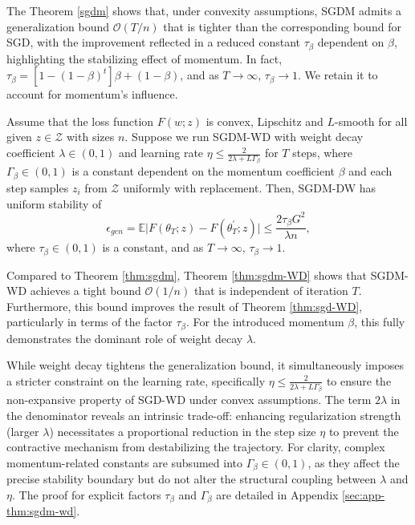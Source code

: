 \begin{remark}
The Theorem \ref{sgdm} shows that, under convexity assumptions, SGDM admits a generalization bound $\mathcal{O}(T/n)$ that is tighter than the corresponding bound for SGD, with the improvement reflected in a reduced constant $\tau_\beta$ dependent on $\beta$, highlighting the stabilizing effect of momentum.
In fact, $\tau_\beta=[1-(1-\beta)^t]\beta+(1-\beta)$, and as $T\rightarrow\infty$, $\tau_{\beta}\rightarrow 1$. We retain it to account for momentum's influence.    
\end{remark}

    

\begin{theorem}\label{thm:sgdm-WD}
Assume that the loss function $F(w;z)$ is convex, Lipschitz and $L$-smooth for all given $z\in\mathcal{Z}$ with sizes $n$. Suppose we run SGDM-WD with weight decay coefficient $\lambda \in (0,1)$ and learning rate $\eta \leq \frac{2}{2\lambda + L\Gamma_{\beta}}$ for $T$ steps, where $\Gamma_{\beta}\in(0,1)$ is a constant dependent on the momentum coefficient $\beta$ and each step samples $z_i$ from $\mathcal{Z}$ uniformly with replacement. Then, SGDM-DW has uniform stability of
\begin{equation}
  \epsilon_{gen} = \mathbb{E}\vert F(\theta_T;z)-F(\theta^{\prime}_T;z)\vert \leq \frac{2\tau_{\beta} G^2 }{\lambda n},
 \end{equation}
 where $\tau_{\beta}\in(0,1)$ is a constant, and as $T\rightarrow\infty$, $\tau_{\beta}\rightarrow 1$. 
\end{theorem}

\begin{remark}
Compared to Theorem \ref{thm:sgdm}, Theorem \ref{thm:sgdm-WD} shows that SGDM-WD achieves a tight bound $\mathcal{O}(1/n)$ that is independent of iteration $T$. Furthermore, this bound improves the result of Theorem \ref{thm:sgd-WD}, particularly in terms of the factor $\tau_{\beta}$. For the introduced momentum $\beta$, this fully demonstrates the dominant role of weight decay $\lambda$.
\end{remark}

\begin{remark}\label{remark 1}
While weight decay tightens the generalization bound, it simultaneously imposes a stricter constraint on the learning rate, specifically $\eta \leq \frac{2}{2\lambda + L\Gamma_{\beta}}$ to ensure the non-expansive property of SGD-WD under convex assumptions. The term $2\lambda$ in the denominator reveals an intrinsic trade-off: enhancing regularization strength (larger $\lambda$) necessitates a proportional reduction in the step size $\eta$ to prevent the contractive mechanism from destabilizing the trajectory. For clarity, complex momentum-related constants are subsumed into $\Gamma_{\beta} \in (0,1)$, as they affect the precise stability boundary but do not alter the structural coupling between $\lambda$ and $\eta$. The proof for explicit factors $\tau_{\beta}$ and $\Gamma_{\beta}$ are detailed in Appendix \ref{sec:app-thm:sgdm-wd}. 
\end{remark}

